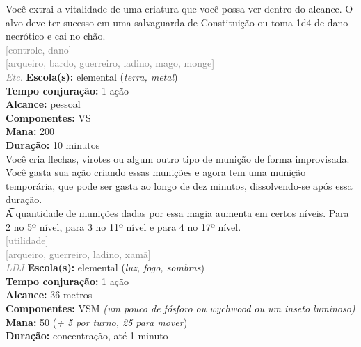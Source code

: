 \documentclass{RPG_Adventure}[2021/10/20]
\begin{document}
{\normalsize Você extrai a vitalidade de uma criatura que você possa ver dentro do alcance. O alvo deve ter sucesso em uma salvaguarda de Constituição ou toma 1d4 de dano necrótico e cai no chão.\\}
{\scriptsize \textcolor{gray}{[controle, dano]\\}}
{\scriptsize \textcolor{gray}{[arqueiro, bardo, guerreiro, ladino, mago, monge]\\}}
{\tiny \textcolor{gray}{\textit{Etc.}}}\jump{}
{\small \t \textbf{Escola(s):} elemental (\textit{terra, metal})\\\t \textbf{Tempo conjuração:} 1 ação\\\t \textbf{Alcance:} pessoal\\\t \textbf{Componentes:} VS\\\t \textbf{Mana:} 200\\\t \textbf{Duração:} 10 minutos\\}
{\normalsize Você cria flechas, virotes ou algum outro tipo de munição de forma improvisada. Você gasta sua ação criando essas munições e agora tem uma munição temporária, que pode ser gasta ao longo de dez minutos, dissolvendo-se após essa duração.\\\t A quantidade de munições dadas por essa magia aumenta em certos níveis. Para 2 no 5º nível, para 3 no 11º nível e para 4 no 17º nível.\\}
{\scriptsize \textcolor{gray}{[utilidade]\\}}
{\scriptsize \textcolor{gray}{[arqueiro, guerreiro, ladino, xamã]\\}}
{\tiny \textcolor{gray}{\textit{LDJ}}}\jump{}
{\small \t \textbf{Escola(s):} elemental (\textit{luz, fogo, sombras})\\\t \textbf{Tempo conjuração:} 1 ação\\\t \textbf{Alcance:} 36 metros\\\t \textbf{Componentes:} VSM \textit{(um pouco de fósforo ou wychwood ou um inseto luminoso)}\\\t \textbf{Mana:} 50 (\textit{+ 5 por turno, 25 para mover})\\\t \textbf{Duração:} concentração, até 1 minuto\\}
\end{document}
